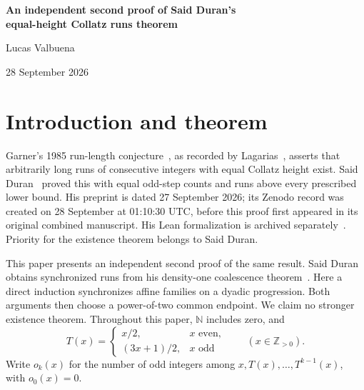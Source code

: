 \documentclass[11pt,a4paper]{article}
\begin{document}
\thispagestyle{plain}
\begin{center}
{\LARGE\bfseries An independent second proof of Said Duran's\\[3pt]equal-height Collatz runs theorem\par}
\vspace{8pt}
{\large Lucas Valbuena\par}
\vspace{4pt}
{\normalsize 28 September 2026}
\end{center}
\vspace{2pt}
\begin{abstract}
Said Duran proved that arbitrarily long consecutive runs of positive
integers have the same finite first hitting time of one under the Collatz
map, with the same number of odd steps, above every prescribed lower
bound. We give an independent second proof in the equivalent finite-pattern
formulation. A direct induction synchronizes affine families on a common
dyadic progression; a power-of-two endpoint then gives equal first hitting
times. Lean~4 verifies the construction and its first-arrival conclusions.
Priority for the existence theorem belongs to Said Duran. The proof
selects translates of each finite pattern and does not establish
convergence from an arbitrary prescribed starting integer.
\end{abstract}

\section{Introduction and theorem}
\label{sec:finite-patterns}

Garner's 1985 run-length conjecture~\cite{Garner1985}, as recorded
by Lagarias~\cite[entry~72, p.~29]{Lagarias2011}, asserts that
arbitrarily long runs of consecutive integers with equal Collatz
height exist. Said Duran~\cite[Theorem~1.1]{SaidDuran2026} proved
this with equal odd-step counts and runs above every prescribed lower
bound. His preprint is dated 27 September 2026; its Zenodo record was
created on 28 September at 01:10:30 UTC, before this proof first appeared in its original combined manuscript. His Lean formalization is archived
separately~\cite{SaidDuranLean2026}. Priority for the existence theorem
belongs to Said Duran.

This paper presents an independent second proof of the same result.
Said Duran obtains synchronized runs from his density-one coalescence
theorem~\cite{SaidDuranGao2026}. Here a direct induction synchronizes
affine families on a dyadic progression. Both arguments then choose
a power-of-two common endpoint. We claim no stronger existence theorem.
Throughout this paper, $\mathbb N$ includes zero, and
\[
T(x)=
\begin{cases}
x/2,&x\text{ even},\\
(3x+1)/2,&x\text{ odd}
\end{cases}
\qquad(x\in\mathbb Z_{>0}).
\]
Write $o_k(x)$ for the number of odd integers among
$x,T(x),\ldots,T^{k-1}(x)$, with $o_0(x)=0$.
\end{document}
